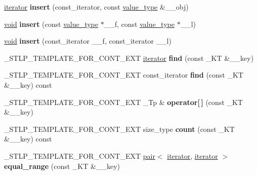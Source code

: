 \begin{DoxyCompactItemize}
\mbox{\label{classunordered__map_af9c8be6af76957fb732a94b5f26d458b}} 
\hyperlink{structiterator}{iterator} {\bfseries insert} (const\+\_\+iterator, const \hyperlink{structpair}{value\+\_\+type} \&\+\_\+\+\_\+obj)
\item 
\mbox{\label{classunordered__map_aa9c7778cce331714bf3a63975b48f05e}} 
\hyperlink{interfacevoid}{void} {\bfseries insert} (const \hyperlink{structpair}{value\+\_\+type} $\ast$\+\_\+\+\_\+f, const \hyperlink{structpair}{value\+\_\+type} $\ast$\+\_\+\+\_\+l)
\item 
\mbox{\label{classunordered__map_a9abcf8dadfe2cb8b07504af62fd487ea}} 
\hyperlink{interfacevoid}{void} {\bfseries insert} (const\+\_\+iterator \+\_\+\+\_\+f, const\+\_\+iterator \+\_\+\+\_\+l)
\item 
\mbox{\label{classunordered__map_a3c71d887e7754b4dc4a1a8a6aeccb58a}} 
\+\_\+\+S\+T\+L\+P\+\_\+\+T\+E\+M\+P\+L\+A\+T\+E\+\_\+\+F\+O\+R\+\_\+\+C\+O\+N\+T\+\_\+\+E\+XT \hyperlink{structiterator}{iterator} {\bfseries find} (const \+\_\+\+KT \&\+\_\+\+\_\+key)
\item 
\mbox{\label{classunordered__map_a8575a2263c6eda0fc62021697a8e23e9}} 
\+\_\+\+S\+T\+L\+P\+\_\+\+T\+E\+M\+P\+L\+A\+T\+E\+\_\+\+F\+O\+R\+\_\+\+C\+O\+N\+T\+\_\+\+E\+XT const\+\_\+iterator {\bfseries find} (const \+\_\+\+KT \&\+\_\+\+\_\+key) const
\item 
\mbox{\label{classunordered__map_a2c8d5f2a526f145de4dae21383323cfc}} 
\+\_\+\+S\+T\+L\+P\+\_\+\+T\+E\+M\+P\+L\+A\+T\+E\+\_\+\+F\+O\+R\+\_\+\+C\+O\+N\+T\+\_\+\+E\+XT \+\_\+\+Tp \& {\bfseries operator\mbox{[}$\,$\mbox{]}} (const \+\_\+\+KT \&\+\_\+\+\_\+key)
\item 
\mbox{\label{classunordered__map_a001fbb2282482257bdfa7cb841ab360c}} 
\+\_\+\+S\+T\+L\+P\+\_\+\+T\+E\+M\+P\+L\+A\+T\+E\+\_\+\+F\+O\+R\+\_\+\+C\+O\+N\+T\+\_\+\+E\+XT size\+\_\+type {\bfseries count} (const \+\_\+\+KT \&\+\_\+\+\_\+key) const
\item 
\mbox{\label{classunordered__map_a8e890fe68fb7f072d820909f9de1fd04}} 
\+\_\+\+S\+T\+L\+P\+\_\+\+T\+E\+M\+P\+L\+A\+T\+E\+\_\+\+F\+O\+R\+\_\+\+C\+O\+N\+T\+\_\+\+E\+XT \hyperlink{structpair}{pair}$<$ \hyperlink{structiterator}{iterator}, \hyperlink{structiterator}{iterator} $>$ {\bfseries equal\+\_\+range} (const \+\_\+\+KT \&\+\_\+\+\_\+key)

\end{DoxyCompactItemize}
